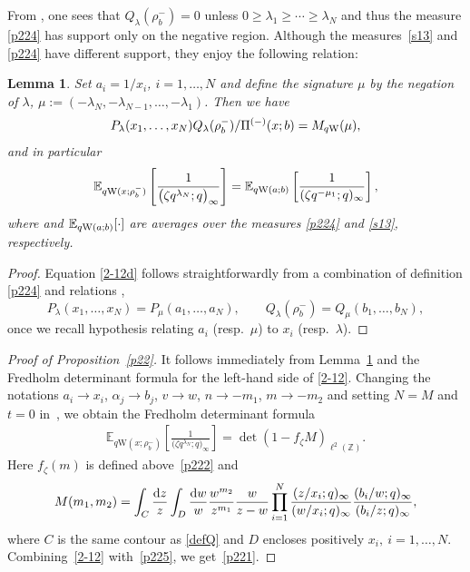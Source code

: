 \documentclass[pdftex]{sigma}
\numberwithin{equation}{section}
\newtheorem{Lemma}[Theorem]{Lemma}
\newcommand{\E}[1]{\widetilde{e}_{#1}}
\def\E{\mathbb{E}}
\def\i{\infty}
\def\l{\lambda}
\def\Z{\mathbb{Z}}
\begin{document}
From \cite[Lemma 3.3, equation~(3.15)]{ImamuraSasamoto2019qTASEPtheta}, one sees that $Q_{\l}(\rho_b^-)=0$ unless
$0\ge \l_1\ge\cdots \ge \l_N$ and thus the measure
\eqref{p224} has support only on the negative region. Although the measures~\eqref{s13} and \eqref{p224} have different support, they enjoy the following relation:
\begin{Lemma} \label{l24}
Set $a_i=1/x_i$, $i=1,\dots,N$ and define the signature $\mu$ by the negation of $\l$,
$\mu:=(-\l_N,-\l_{N-1},\dots,-\l_1)$.
 Then we have
\begin{align}
\label{2-12d}
 P_{\l}(x_1,\dots,x_N)Q_{\l}(\rho^{-}_b)/\Pi^{(-)}(x;b)
=
M_{q{\rm W}}(\mu),
 \end{align}
 and in particular
\begin{align}
\label{2-12}
 \E_{q{\rm W}(x;\rho_b^-)}\left[\frac{1}{\big(\zeta q^{\l_N};q\big)_{\i}}\right]
 =
 \E_{q{\rm W}(a;b)}\left[\frac{1}{(\zeta q^{-\mu_1};q)_{\i}}\right],
\end{align}
 where \smash{$\E_{q{\rm W}(x;\rho_b^-)}[\cdot]$}
 and $\E_{q{\rm W}(a;b)}[\cdot]$
 are averages over the measures
 \eqref{p224} and \eqref{s13}, respectively.
\end{Lemma}
\begin{proof}
 Equation \eqref{2-12d} follows straightforwardly from a combination of definition \eqref{p224}
 and relations \cite[equations~(3.14) and (3.15)]{ImamuraSasamoto2019qTASEPtheta},
 \[%
 P_{\l}(x_1,\dots,x_N)=P_{\mu} (a_1,\dots,a_N),
 \qquad
 Q_{\l}(\rho^-_b)=Q_{\mu}(b_1,\dots,b_N),
 \]
 once we recall hypothesis relating $a_i$ (resp.\ $\mu$)
 to $x_i$ (resp.\ $\l$).
\end{proof}

\begin{proof}[Proof of Proposition~\ref{p22}]
 It follows immediately from Lemma~\ref{l24}
 and the Fredholm determinant formula
 for the left-hand side of \eqref{2-12}.
 Changing the notations $a_i\rightarrow x_i$,
 $\alpha_j\rightarrow b_j$,
 $v\rightarrow w$,
 $n\rightarrow -m_1$, $m\rightarrow -m_2$
 and setting $N=M$ and $t=0$
 in~\cite[equation~(4.37)]{ImamuraSasamoto2019qTASEPtheta},
 we obtain the Fredholm determinant formula
\begin{align}
\label{p225}
\E_{q\text{W}(x;\rho_b^-)}\left[\frac{1}{\big(\zeta q^{\l_N};q\big)_{\i}}\right]
=
\det(1-f_{\zeta} M)_{\ell^2(\Z)}.
\end{align}
Here $f_{\zeta}(m)$ is defined above~\eqref{p222}
and
\begin{align*}%
M(m_1,m_2)=
\int_C\frac{{\rm d}z}{z}\int_{D}\frac{{\rm d}w}{w}
\frac{w^{m_2}}{z^{m_1}}
\frac{w}{z-w}
\prod_{i=1}^N
\frac{(z/x_i;q)_{\i}}{(w/x_i;q)_{\i}}
\frac{(b_i/w;q)_{\i}}{(b_i/z;q)_{\i}},
\end{align*}
where $C$ is the same contour as \eqref{defQ} and $D$ encloses positively
$x_i,~i=1,\dots,N$.
Combining~\eqref{2-12} with~\eqref{p225},
we get~\eqref{p221}.
\end{proof}
\end{document}
